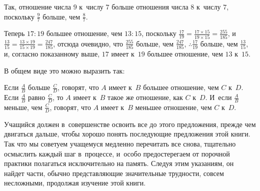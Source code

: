 \documentclass[letters,booklanguage=russian]{byrnebook}
\begin{document}
Так, отношение числа $9$ к~числу $7$ больше отношения числа $8$ к~числу $7$, поскольку $\frac{9}{7}$ больше, чем $\frac{8}{7}$.

Теперь $17 : 19$ большее отношение, чем $13 : 15$, поскольку $\frac{17}{19} = \frac{17 \times 15}{19 \times 15} = \frac{255}{185}$, и~$\frac{13}{15} = \frac{13 \times 19}{15 \times 19} = \frac{247}{185}$, отсюда очевидно, что $\frac{255}{185}$ больше, чем $\frac{247}{185}$, $\therefore \frac{17}{19}$ больше, чем $\frac{13}{15}$, и, согласно показанному выше, $17$ имеет к~$19$ большее отношение, чем $13$ к~$15$.

В общем виде это можно выразить так:

Если $\frac{A}{B}$ больше $\frac{C}{D}$, говорят, что $A$ имеет к~$B$ большее отношение, чем $C$ к~$D$. Если $\frac{A}{B}$ равно $\frac{C}{D}$, то $A$ имеет к~$B$ такое же отношение, как $C$ к~$D$. И~если $\frac{A}{B}$ меньше, чем $\frac{C}{D}$, говорят, что $A$ имеет к~$B$ меньшее отношение, чем $C$ к~$D$.

Учащийся должен в~совершенстве освоить все до этого предложения, прежде чем двигаться дальше, чтобы хорошо понять последующие предложения этой книги. Так что мы советуем учащемуся медленно перечитать все снова, тщательно осмыслить каждый шаг в~процессе, и~особо предостерегаем от порочной практики полагаться исключительно на память. Следуя этим указаниям, он найдет части, обычно представляющие значительные трудности, совсем несложными, продолжая изучение этой книги.

\vfill\pagebreak

\end{document}
